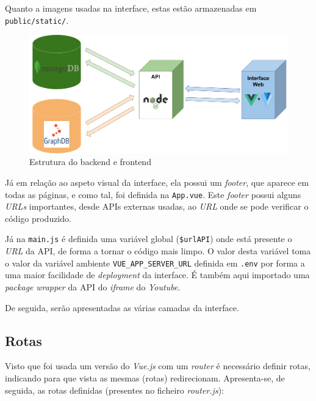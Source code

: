 \documentclass{article}
\begin{document}
Quanto a imagens usadas na interface, estas estão armazenadas em \texttt{public/static/}.

\begin{figure}[H]
    \centering
    \includegraphics[width=12cm]{Pictures/backend_frontend.png}
    \caption{Estrutura do backend e frontend}
    \label{backend_frontend}
\end{figure}

Já em relação ao aspeto visual da interface, ela possui um \textit{footer}, que aparece em todas as páginas, e como tal, foi definida na \texttt{App.vue}. Este \textit{footer} possui alguns \textit{URLs} importantes, desde APIs externas usadas, ao \textit{URL} onde se pode verificar o código produzido.

Já na \texttt{main.js} é definida uma variável global (\texttt{\$urlAPI}) onde está presente o \textit{URL} da API, de forma a tornar o código mais limpo. O valor desta variável toma o valor da variável ambiente \texttt{VUE\_APP\_SERVER\_URL} definida em \texttt{.env} por forma a uma maior facilidade de \textit{deployment} da interface. É também aqui importado uma \textit{package} \textit{wrapper} da API do \textit{iframe} do \textit{Youtube}.

De seguida, serão apresentadas as várias camadas da interface.

\subsection{Rotas}

Visto que foi usada um versão do \textit{Vue.js} com um \textit{router} é necessário definir rotas, indicando para que vista as mesmas (rotas) redirecionam. Apresenta-se, de seguida, as rotas definidas (presentes no ficheiro \textit{router.js}):
\end{document}
